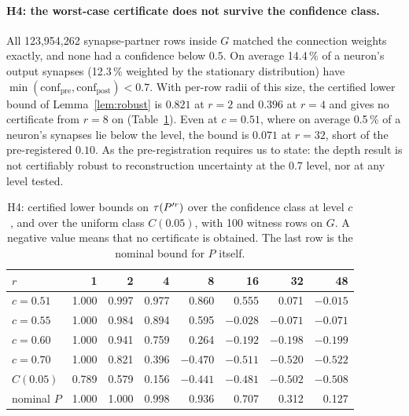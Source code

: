 \paragraph{H4: the worst-case certificate does not survive the confidence class.}
All 123{,}954{,}262 synapse-partner rows inside $G$ matched the connection weights exactly, and none
had a confidence below $0.5$. On average 14.4\,\% of a neuron's output synapses (12.3\,\% weighted by
the stationary distribution) have $\min(\text{conf}_\text{pre},\text{conf}_\text{post})<0.7$. With
per-row radii of this size, the certified lower bound of Lemma~\ref{lem:robust} is $0.821$ at $r=2$
and $0.396$ at $r=4$ and gives no certificate from $r=8$ on (Table~\ref{tab:h4}). Even at $c=0.51$,
where on average 0.5\,\% of a neuron's synapses lie below the level, the bound is $0.071$ at $r=32$, short of the
pre-registered $0.10$. As the pre-registration requires us to state: the depth result is not
certifiably robust to reconstruction uncertainty at the 0.7 level, nor at any level tested.

\begin{table}[t]
\centering
\small
\caption{H4: certified lower bounds on $\tau(P'^r)$ over the confidence class at level $c$, and over
the uniform class $C(0.05)$, with 100 witness rows on $G$. A negative value means that no certificate
is obtained. The last row is the nominal bound for $P$ itself.}
\label{tab:h4}
\begin{tabular}{@{}lrrrrrrr@{}}
\toprule
$r$ & 1 & 2 & 4 & 8 & 16 & 32 & 48 \\
\midrule
$c=0.51$ & 1.000 & 0.997 & 0.977 & 0.860 & 0.555 & 0.071 & $-0.015$ \\
$c=0.55$ & 1.000 & 0.984 & 0.894 & 0.595 & $-0.028$ & $-0.071$ & $-0.071$ \\
$c=0.60$ & 1.000 & 0.941 & 0.759 & 0.264 & $-0.192$ & $-0.198$ & $-0.199$ \\
$c=0.70$ & 1.000 & 0.821 & 0.396 & $-0.470$ & $-0.511$ & $-0.520$ & $-0.522$ \\
$C(0.05)$ & 0.789 & 0.579 & 0.156 & $-0.441$ & $-0.481$ & $-0.502$ & $-0.508$ \\
\addlinespace
nominal $P$ & 1.000 & 1.000 & 0.998 & 0.936 & 0.707 & 0.312 & 0.127 \\
\bottomrule
\end{tabular}
\end{table}
